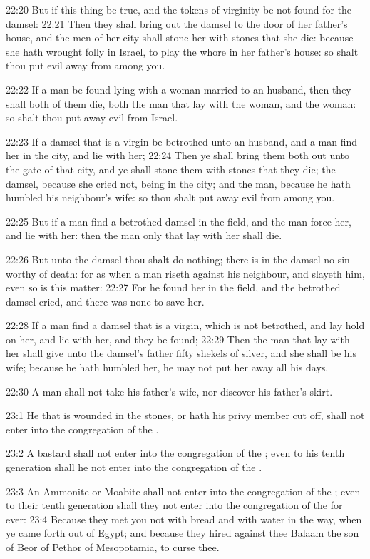 22:20 But if this thing be true, and the tokens of virginity be not
found for the damsel: 22:21 Then they shall bring out the damsel to
the door of her father's house, and the men of her city shall stone
her with stones that she die: because she hath wrought folly in
Israel, to play the whore in her father's house: so shalt thou put
evil away from among you.

22:22 If a man be found lying with a woman married to an husband, then
they shall both of them die, both the man that lay with the woman, and
the woman: so shalt thou put away evil from Israel.

22:23 If a damsel that is a virgin be betrothed unto an husband, and a
man find her in the city, and lie with her; 22:24 Then ye shall bring
them both out unto the gate of that city, and ye shall stone them with
stones that they die; the damsel, because she cried not, being in the
city; and the man, because he hath humbled his neighbour's wife: so
thou shalt put away evil from among you.

22:25 But if a man find a betrothed damsel in the field, and the man
force her, and lie with her: then the man only that lay with her shall
die.

22:26 But unto the damsel thou shalt do nothing; there is in the
damsel no sin worthy of death: for as when a man riseth against his
neighbour, and slayeth him, even so is this matter: 22:27 For he found
her in the field, and the betrothed damsel cried, and there was none
to save her.

22:28 If a man find a damsel that is a virgin, which is not betrothed,
and lay hold on her, and lie with her, and they be found; 22:29 Then
the man that lay with her shall give unto the damsel's father fifty
shekels of silver, and she shall be his wife; because he hath humbled
her, he may not put her away all his days.

22:30 A man shall not take his father's wife, nor discover his
father's skirt.

23:1 He that is wounded in the stones, or hath his privy member cut
off, shall not enter into the congregation of the \LORD.

23:2 A bastard shall not enter into the congregation of the \LORD; even
to his tenth generation shall he not enter into the congregation of
the \LORD.

23:3 An Ammonite or Moabite shall not enter into the congregation of
the \LORD; even to their tenth generation shall they not enter into the
congregation of the \LORD for ever: 23:4 Because they met you not with
bread and with water in the way, when ye came forth out of Egypt; and
because they hired against thee Balaam the son of Beor of Pethor of
Mesopotamia, to curse thee.

